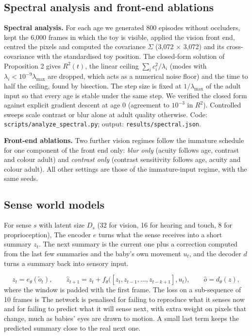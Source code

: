 \documentclass{article}
\begin{document}
\hypertarget{spectral-analysis-and-front-end-ablations}{%
\subsection{Spectral analysis and front-end ablations}\label{spectral-analysis-and-front-end-ablations}}

\textbf{Spectral analysis.} For each age we generated 800 episodes without occluders, kept the 6,000 frames in which the toy is visible, applied the vision front end, centred the pixels and computed the covariance \(\Sigma\) (3,072 \ensuremath{\times} 3,072) and its cross-covariance with the standardised toy position. The closed-form solution of Proposition 2 gives \(R^2(t)\), the linear ceiling \(\sum_i c_i^2/\lambda_i\) (modes with \(\lambda_i<10^{-9}\lambda_{\max}\) are dropped, which acts as a numerical noise floor) and the time to half the ceiling, found by bisection. The step size is fixed at \(1/\lambda_{\max}\) of the adult input so that every age is stable under the same step. We verified the closed form against explicit gradient descent at age 0 (agreement to \(10^{-3}\) in \(R^2\)). Controlled sweeps scale contrast or blur alone at adult quality otherwise. Code: \texttt{scripts/analyze\_spectral.py}; output: \texttt{results/spectral.json}.

\textbf{Front-end ablations.} Two further vision regimes follow the immature schedule for one component of the front end only: \emph{blur only} (acuity follows age, contrast and colour adult) and \emph{contrast only} (contrast sensitivity follows age, acuity and colour adult). All other settings are those of the immature-input regime, with the same seeds.

\hypertarget{sense-world-models}{%
\subsection{Sense world models}\label{sense-world-models}}

For sense \(s\) with latent size \(D_s\) (32 for vision, 16 for hearing and touch, 8 for proprioception),
The encoder \(e\) turns what the sense receives into a short summary \(z_t\). The next summary is the current one plus a correction computed from the last few summaries and the baby's own movement \(u_t\), and the decoder \(d\) turns a summary back into sensory input.

\begin{equation}z_t=e_\theta(\tilde o_t),\qquad \hat z_{t+1}=z_t+f_\theta\big([z_t,z_{t-1},\dots,z_{t-k+1}],u_t\big),\qquad \hat o=d_\theta(z),\end{equation}
where the window is padded with the first frame. The loss on a sub-sequence of 10 frames is
The network is penalised for failing to reproduce what it senses now and for failing to predict what it will sense next, with extra weight on pixels that change, much as babies' eyes are drawn to motion. A small last term keeps the predicted summary close to the real next one.
\end{document}
